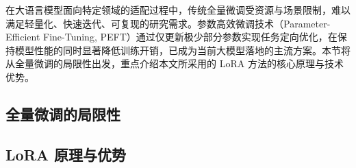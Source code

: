 
在大语言模型面向特定领域的适配过程中，传统全量微调受资源与场景限制，难以满足轻量化、快速迭代、可复现的研究需求。参数高效微调技术（Parameter-Efficient Fine-Tuning, PEFT）通过仅更新极少部分参数实现任务定向优化，在保持模型性能的同时显著降低训练开销，已成为当前大模型落地的主流方案。本节将从全量微调的局限性出发，重点介绍本文所采用的 LoRA 方法的核心原理与技术优势。

\subsection{全量微调的局限性}


\subsection{LoRA 原理与优势}
